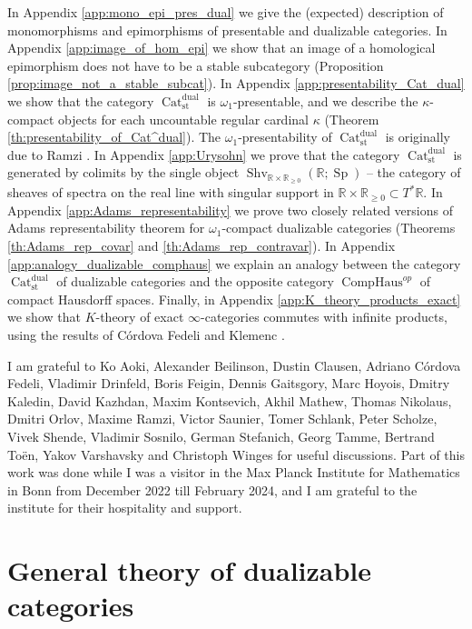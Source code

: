 \documentclass[11pt,leqno]{amsart}
\numberwithin{equation}{section}
\def\R{\mathbb{R}}
\newcommand{\comphaus}{\operatorname{CompHaus}}
\newcommand{\Cat}{\operatorname{Cat}}
\newcommand{\st}{\operatorname{st}}
\newcommand{\dual}{\operatorname{dual}}
\newcommand{\Sh}{\operatorname{Shv}}
\newcommand{\Sp}{\operatorname{Sp}}
\begin{document}
In Appendix \ref{app:mono_epi_pres_dual} we give the (expected) description of monomorphisms and epimorphisms of presentable and dualizable categories. In Appendix \ref{app:image_of_hom_epi} we show that an image of a homological epimorphism does not have to be a stable subcategory (Proposition \ref{prop:image_not_a_stable_subcat}). In Appendix \ref{app:presentability_Cat_dual} we show that the category $\Cat_{\st}^{\dual}$ is $\omega_1$-presentable, and we describe the $\kappa$-compact objects for each uncountable regular cardinal $\kappa$ (Theorem \ref{th:presentability_of_Cat^dual}). The $\omega_1$-presentability of $\Cat_{\st}^{\dual}$ is originally due to Ramzi \cite{Ram24a}. In Appendix \ref{app:Urysohn} we prove that the category $\Cat_{\st}^{\dual}$ is generated by colimits by the single object $\Sh_{\R\times\R_{\geq 0}}(\R;\Sp)$ -- the category of sheaves of spectra on the real line with singular support in $\R\times\R_{\geq 0}\subset T^*\R.$ In Appendix \ref{app:Adams_representability} we prove two closely related versions of Adams representability theorem for $\omega_1$-compact dualizable categories (Theorems \ref{th:Adams_rep_covar} and \ref{th:Adams_rep_contravar}). In Appendix \ref{app:analogy_dualizable_comphaus} we explain an analogy between the category $\Cat_{\st}^{\dual}$ of dualizable categories and the opposite category $\comphaus^{op}$ of compact Hausdorff spaces. Finally, in Appendix \ref{app:K_theory_products_exact} we show that $K$-theory of exact $\infty$-categories commutes with infinite products, using the results of C\'ordova Fedeli \cite{Cor} and Klemenc \cite{Kle}.

{} I am grateful to Ko Aoki, Alexander Beilinson, Dustin Clausen, Adriano C\'ordova Fedeli, Vladimir Drinfeld, Boris Feigin, Dennis Gaitsgory, Marc Hoyois, Dmitry Kaledin, David Kazhdan, Maxim Kontsevich, Akhil Mathew, Thomas Nikolaus, Dmitri Orlov, Maxime Ramzi, Victor Saunier, Tomer Schlank, Peter Scholze, Vivek Shende, Vladimir Sosnilo, German Stefanich, Georg Tamme, Bertrand To\"en, Yakov Varshavsky and Christoph Winges for useful discussions. Part of this work was done while I was a visitor in the Max Planck Institute for Mathematics in Bonn from December 2022 till February 2024, and I am grateful to the institute for their hospitality and support.  

\section{General theory of dualizable categories}
\label{sec:general_theory_dualizable}
\end{document}
